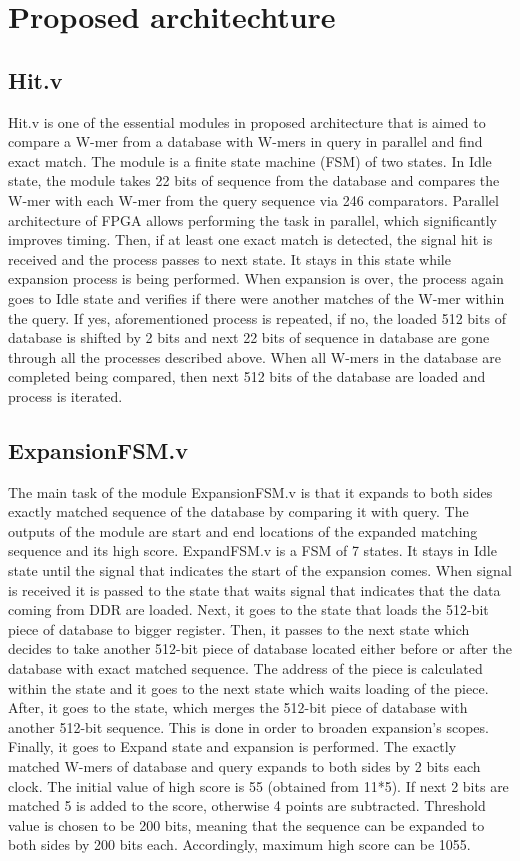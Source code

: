 \section{Proposed architechture}
\label{sec:introduction}

\subsection{Hit.v}
Hit.v is one of the essential modules in proposed architecture that is aimed to compare a W-mer from a database with W-mers in query in parallel and find exact match. The module is a finite state machine (FSM) of two states. In Idle state, the module takes 22 bits of sequence from the database and compares the W-mer with each W-mer from the query sequence via 246 comparators. Parallel architecture of FPGA allows performing the task in parallel, which significantly improves timing. Then, if at least one exact match is detected, the signal hit is received and the process passes to next state. It stays in this state while expansion process is being performed. When expansion is over, the process again goes to Idle state and verifies if there were another matches of the W-mer within the query. If yes, aforementioned process is repeated, if no, the loaded 512 bits of database is shifted by 2 bits and next 22 bits of sequence in database are gone through all the processes described above. When all W-mers in the database are completed being compared, then next 512 bits of the database are loaded and process is iterated. 
\subsection{ExpansionFSM.v}
The main task of the module ExpansionFSM.v is that it expands to both sides exactly matched sequence of the database by comparing it with query. The outputs of the module are start and end locations of the expanded matching sequence and its high score. ExpandFSM.v is a FSM of 7 states. It stays in Idle state until the signal that indicates the start of the expansion comes. When signal is received it is passed to the state that waits signal that indicates that the data coming from DDR are loaded. Next, it goes to the state that loads the 512-bit piece of database to bigger register. Then, it passes to the next state which decides to take another 512-bit piece of database located either before or after the database with exact matched sequence. The address of the piece is calculated within the state and it goes to the next state which waits loading of the piece. After, it goes to the state, which merges the 512-bit piece of database with another 512-bit sequence. This is done in order to broaden expansion’s scopes. Finally, it goes to Expand state and expansion is performed. The exactly matched W-mers of database and query expands to both sides by 2 bits each clock. The initial value of high score is 55 (obtained from 11*5). If next 2 bits are matched 5 is added to the score, otherwise 4 points are subtracted. Threshold value is chosen to be 200 bits, meaning that the sequence can be expanded to both sides by 200 bits each. Accordingly, maximum high score can be 1055. 
